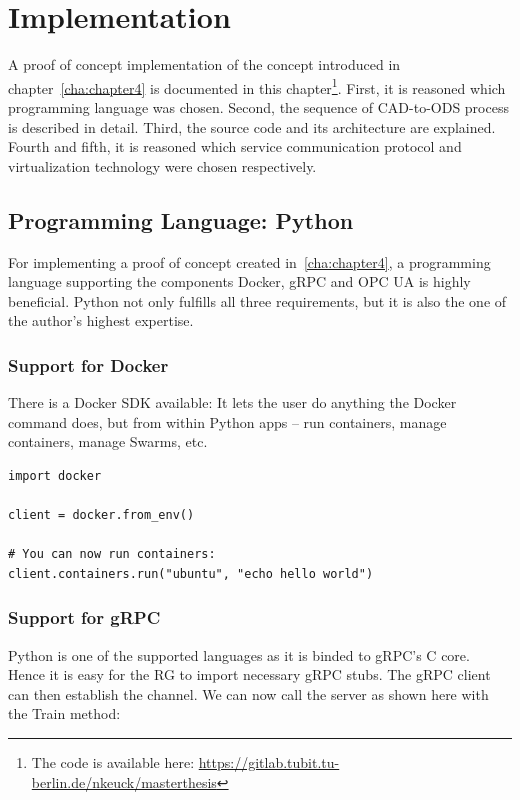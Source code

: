 \chapter{Implementation\label{cha:chapter5}}
A proof of concept implementation of the concept introduced in chapter~\ref{cha:chapter4} is documented in this chapter\footnote{The code is available here: \url{https://gitlab.tubit.tu-berlin.de/nkeuck/masterthesis}}. First, it is reasoned which programming language was chosen. Second, the sequence of CAD-to-ODS process is described in detail. Third, the source code and its architecture are explained. Fourth and fifth, it is reasoned which service communication protocol and virtualization technology were chosen respectively.

\section{Programming Language: Python}
For implementing a proof of concept created in~\ref{cha:chapter4}, a programming language supporting the components Docker, gRPC and OPC UA is highly beneficial. Python not only fulfills all three requirements, but it is also the one of the author's highest expertise.

\subsection{Support for Docker}
There is a Docker SDK available: It lets the user do anything the Docker command does, but from within Python apps – run containers, manage containers, manage Swarms, etc.~\cite{Docker-Py-Documentation2019Docker2019}
\begin{verbatim}
import docker

client = docker.from_env()

# You can now run containers:
client.containers.run("ubuntu", "echo hello world")
\end{verbatim}

\subsection{Support for gRPC}
\label{sec:grpcpython}
Python is one of the supported languages as it is binded to gRPC's C core.~\cite{gRPC-Documentation2019Last2019} Hence it is easy for the RG to import necessary gRPC stubs. The gRPC client can then establish the channel. We can now call the server as shown here with the Train method:

